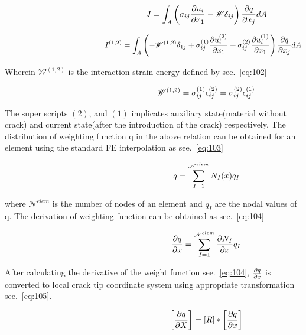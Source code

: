 \documentclass[fleqn, 12.5pt,a4paper]{report}
\begin{document}
\begin{align}\label{eq:100}\hspace{4.5cm}
J = \int_A \left(\sigma_{ij} \pdv{u_i}{x_1} - \mathscr{W}\delta_{ij}\right) \pdv{q}{x_j}dA
\end{align}

\begin{align}\label{eq:101}\hspace{4.5cm}
I^{(1,2)} = \int_A \left(- \mathscr{W}^{(1,2)}\delta_{1j} + \sigma_{ij}^{(1)} \pdv{u_i^{(2)}}{x_1} + \sigma_{ij}^{(2)} \pdv{u_i^{(1)}}{x_1}\right) \pdv{q}{x_j}dA
\end{align}

Wherein $\mathscr{W}^{(1,2)}$ is the interaction strain energy \cite{kuna2013finite} defined by see.~\autoref{eq:102}

\begin{align}\label{eq:102}\hspace{4.5cm}
\mathscr{W}^{(1,2)} = \sigma_{ij}^{(1)} \epsilon_{ij}^{(2)} = \sigma_{ij}^{(2)} \epsilon_{ij}^{(1)}
\end{align}

The super scripts $(2)$, and $(1)$ implicates auxiliary state(material without crack) and current state(after the introduction of the crack) respectively.
The distribution of weighting function q in the above relation can be obtained for an element using the standard FE interpolation \cite{kuna2013finite} as see.~\autoref{eq:103}

\begin{align}\label{eq:103}\hspace{4.5cm}
q = \sum_{I=1}^{\mathscr{N}^{elem}} N_I(x)q_I
\end{align}

where ${\mathscr{N}^{elem}}$ is the number of nodes of an element and $q_I$ are the nodal values of q. The derivation of weighting function can be obtained as see.~\autoref{eq:104}

\begin{align}\label{eq:104}\hspace{4.5cm}
\pdv{q}{x} = \sum_{I=1}^{\mathscr{N}^{elem}} \pdv{N_I}{x}q_I
\end{align}

After calculating the derivative of the weight function see.~\autoref{eq:104}, $\pdv{q}{x}$ is converted to local crack tip coordinate system using appropriate transformation see.~\autoref{eq:105}.

\begin{align}\label{eq:105}\hspace{4.5cm}
\left[\pdv{q}{X}\right] = [R] * \left[\pdv{q}{x}\right] 
\end{align}
\end{document}
